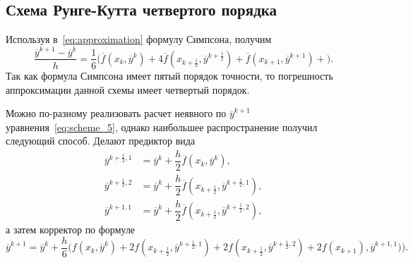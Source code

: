 \subsection{Схема Рунге-Кутта четвертого порядка}

Используя в~\eqref{eq:approximation} формулу Симпсона, получим
\begin{equation}
  \dfrac{\overline{y}^{k+1} - \overline{y}^k}{h} =
  \dfrac{1}{6} \bigg(
  \overline{f}(x_{k}, \overline{y}^{k}) +
  4 \overline{f}(x_{k+\frac{1}{2}}, \overline{y}^{k+\frac{1}{2}}) +
  \overline{f}(x_{k+1}, \overline{y}^{k+1}) +
  \bigg).
  \label{eq:scheme_5}
\end{equation}
Так как формула Симпсона имеет пятый порядок точности, то погрешность
аппроксимации данной схемы имеет четвертый порядок.

Можно по-разному реализовать расчет неявного по \( \overline{y}^{k+1} \)
уравнения~\eqref{eq:scheme_5}, однако наибольшее распространение получил
следующий способ. Делают предиктор вида
\begin{align*}
  \overline{y}^{k+\frac{1}{2}, 1} &= \overline{y}^{k} + \dfrac{h}{2} \overline{f}(x_k, \overline{y}^k), \\
  \overline{y}^{k+\frac{1}{2}, 2} &= \overline{y}^{k} + \dfrac{h}{2} \overline{f}(x_{k+\frac{1}{2}}, \overline{y}^{k+\frac{1}{2}, 1}), \\
  \overline{y}^{k+1, 1} &= \overline{y}^{k} + \dfrac{h}{2} \overline{f}(x_{k+\frac{1}{2}}, \overline{y}^{k+\frac{1}{2}, 2}),
\end{align*}
а затем корректор по формуле
\begin{equation*}
  \overline{y}^{k+1} =
  \overline{y}^k + \dfrac{h}{6}
  \bigg(
  f(x_k, \overline{y}^k) +
  2 f(x_{k + \frac{1}{2}}, \overline{y}^{{k + \frac{1}{2}}, 1}) +
  2 f(x_{k + \frac{1}{2}}, \overline{y}^{{k + \frac{1}{2}}, 2}) +
  2 f(x_{k + 1}), \overline{y}^{{k + 1}, 1})
  \bigg).
\end{equation*}

